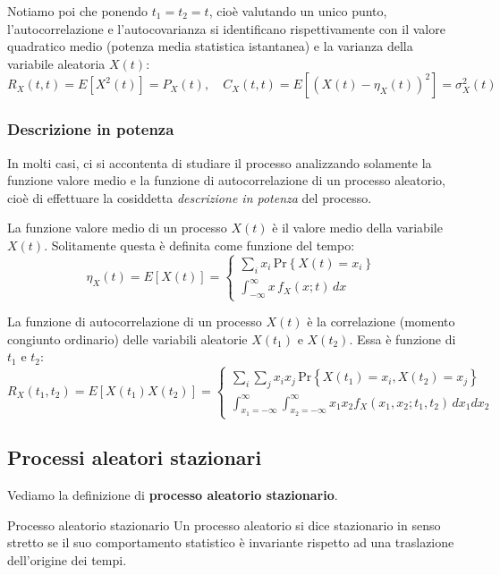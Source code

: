 \documentclass[a4paper,11pt]{article}
\begin{document}
Notiamo poi che ponendo $t_1 = t_2 = t$, cioè valutando un unico punto, l'autocorrelazione e l'autocovarianza si identificano rispettivamente con il valore quadratico medio (potenza media statistica istantanea) e la varianza della variabile aleatoria $X(t)$:
$$
R_X(t, t) = E\left[ X^2(t) \right] = P_X(t), \quad C_X(t, t) = E\left[ (X(t) - \eta_X(t))^2 \right] = \sigma^2_X(t)
$$

\subsubsection{Descrizione in potenza}
In molti casi, ci si accontenta di studiare il processo analizzando solamente la funzione valore medio e la funzione di autocorrelazione di un processo aleatorio, cioè di effettuare la cosiddetta \textit{descrizione in potenza} del processo.

La funzione valore medio di un processo $X(t)$ è il valore medio della variabile $X(t)$. Solitamente questa è definita come funzione del tempo:
$$
\eta_X(t) = E\left[ X(t) \right] =
\begin{cases}
	\sum_i x_i \, \mathrm{Pr} \left\{ X(t) = x_i \right\} \\
	\int_{-\infty}^{\infty} x \, f_X(x; t) \, dx
\end{cases}
$$

La funzione di autocorrelazione di un processo $X(t)$ è la correlazione (momento congiunto ordinario) delle variabili aleatorie $X(t_1)$ e $X(t_2)$. Essa è funzione di $t_1$ e $t_2$:
$$
R_X(t_1, t_2) = E \left[ X(t_1) X(t_2) \right] = 
\begin{cases}
	\sum_i \sum_j x_i x_j \, \mathrm{Pr} \left\{ X(t_1) = x_i , X(t_2) = x_j \right\}	\\
	\int_{x_1 = -\infty}^{\infty} \int_{x_2 = -\infty}^{\infty} x_1 x_2 f_X(x_1, x_2; t_1, t_2) \, dx_1 dx_2
\end{cases}
$$

\subsection{Processi aleatori stazionari}
Vediamo la definizione di \textbf{processo aleatorio stazionario}.
\begin{definition}{Processo aleatorio stazionario}
Un processo aleatorio si dice stazionario in senso stretto se il suo comportamento statistico è invariante rispetto ad una traslazione dell'origine dei tempi.
\end{definition}
\end{document}
